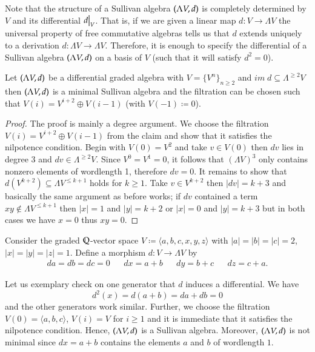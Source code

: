 Note that the structure of a Sullivan algebra $(\Lambda V,d)$ is completely determined by  $V$ and its
differential $\restr{d}{V}$. That is, if we are given a linear map $d \colon V \to \Lambda V$ the
universal property of free commutative algebras tells us that $d$ extends uniquely to a derivation $d \colon \Lambda V \to \Lambda V$.
Therefore, it is enough to specify the differential of a Sullivan algebra $(\Lambda V,d)$ on a basis of $V$ (such that
it will satisfy $d^2 = 0$).


\begin{Proposition}
\label{prop:WellBehavedFiltrations}
 Let $(\Lambda V,d)$ be a differential graded algebra with $V = {\lbrace V^n \rbrace}_{n \geq 2}$ and 
 ${im \;d \subseteq \Lambda^{\geq 2} V}$ then $(\Lambda V,d)$ is a minimal Sullivan algebra and
 the filtration can be chosen such that $V(i) = V^{i+2} \oplus V(i-1)$ (with $V(-1) \coloneqq 0$).
\end{Proposition}
\begin{proof}
 The proof is mainly a degree argument. We choose the filtration $V(i) = V^{i+2} \oplus V(i-1)$ from the claim
 and show that it satisfies
 the nilpotence condition. Begin with $V(0) = V^2$ and take $v \in V(0)$ then $dv$ lies in
	degree $3$ and $dv \in \Lambda^{\geq 2} V$. Since $V^0 = V^1 = 0$, it follows that ${(\Lambda V)}^3$ only contains 
 nonzero elements of wordlength 1, therefore $dv = 0$. 
 It remains to show that  $d(V^{k+2}) \subseteq \Lambda V^{ \leq k+1}$ holds for $k \geq 1$. Take $v \in V^{ k+2}$ then 
 $| dv | = k + 3$ and basically the same argument as before works; if $dv$ contained a term $xy \notin \Lambda V^{\leq k+1}$
 then $|x| = 1$ and $|y| = k + 2$ or $|x| = 0$ and $|y| = k + 3$ but in both cases we have $x = 0$ thus $xy = 0$.
\end{proof}

\begin{Example}
\label{ex:AlgebraConstructedFromK3}
 Consider the graded $\mathbb{Q}$-vector space $V \coloneqq \langle a,b,c, x,y,z \rangle$ with $|a| = |b| = |c| = 2$,
 $|x| = |y| = |z| = 1$. Define a morphism $d \colon V \to \Lambda V$ by 
 \begin{align*}
 da = db = dc = 0 & &
 dx = a + b & & dy = b + c & & dz = c + a.  
 \end{align*}

 
 Let us exemplary check on one generator 
 that $d$ induces a differential. We have 
 $$d^2(x) = d(a + b) = da + db = 0$$ and the other generators work similar.
 Further, we choose the filtration $V(0) = \langle a,b,c \rangle$, $V(i) = V$ for $i \geq 1$ and it is 
 immediate that it satisfies the nilpotence condition. Hence, $(\Lambda V,d)$ is a Sullivan algebra. Moreover,
 $(\Lambda V,d)$ is not minimal since $dx = a + b$ contains the elements $a$ and $b$ of wordlength $1$. \\
\end{Example}


